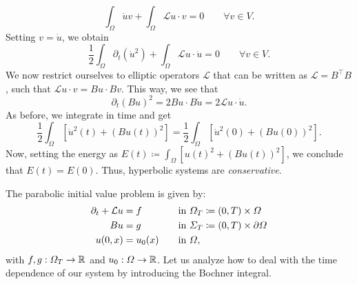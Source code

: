 \begin{enumerate}
    \begin{equation}
        \int_\Omega \ddot{u}v + \int_\Omega \mathcal{L}u\cdot v = 0 \qquad \forall v\in V.
    \end{equation}
    Setting $v=\dot{u}$, we obtain
    \begin{equation}
        \frac{1}{2}\int_\Omega \partial_t (\dot{u}^2) + \int_\Omega \mathcal{L}u\cdot \dot{u} = 0 \qquad \forall v\in V.
    \end{equation}
    We now restrict ourselves to elliptic operators $\mathcal{L}$ that can be written as $\mathcal{L}=B^\top B$, such that $\mathcal{L}u\cdot v = Bu\cdot Bv$. This way, we see that 
    \begin{equation}
        \partial_t (Bu)^2 = 2Bu \cdot B\dot{u} = 2\mathcal{L}u\cdot \dot{u}.
    \end{equation}
    As before, we integrate in time and get 
    \begin{equation}
        \frac{1}{2} \int_\Omega \left[\dot{u}^2(t) + (Bu(t))^2\right] = \frac{1}{2} \int_\Omega \left[\dot{u}^2(0) + (Bu(0))^2\right].
    \end{equation}
    Now, setting the energy as $E(t)  \coloneqq  \int_\Omega \left[u(t)^2 + (Bu(t))^2\right]$, we conclude that $E(t) = E(0)$. Thus, hyperbolic systems are \emph{conservative}.
\end{enumerate}
The parabolic initial value problem is given by:
\begin{equation*}
    \begin{aligned}
        \partial_t + \mathcal{L}u &= f &&\quad \text{in }\Omega_T  \coloneqq  (0,T) \times \Omega\\
        \hfill Bu &= g &&\quad \text{in }\Sigma_T  \coloneqq  (0,T) \times \partial\Omega\\
        \hfill u(0,x)&= u_0(x) &&\quad \text{in }\Omega,
    \end{aligned}
\end{equation*}
with $f,g:\Omega_T\to \mathbb{R}$ and $u_0:\Omega\to\mathbb{R}$. Let us analyze how to deal with the time dependence of our system by introducing the Bochner integral.

